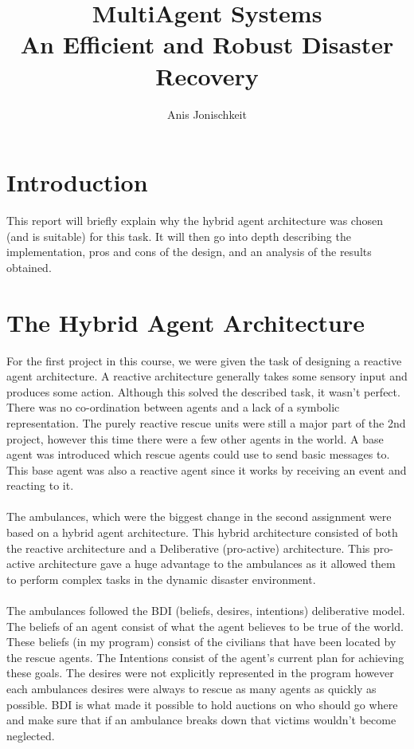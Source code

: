 \documentclass[titlepage]{article}
\begin{document}
\title{MultiAgent Systems \\ An Efficient and Robust Disaster Recovery}
\author{Anis Jonischkeit}

\maketitle

\section{Introduction}
  This report will briefly explain why the hybrid agent architecture was chosen (and is suitable) for this task. It will then go into depth describing the implementation, pros and cons of the design, and an analysis of the results obtained.

\section{The Hybrid Agent Architecture}
  For the first project in this course, we were given the task of designing a reactive agent architecture. A reactive architecture generally takes some sensory input and produces some action. Although this solved the described task, it wasn't perfect. There was no co-ordination between agents and a lack of a symbolic representation. The purely reactive rescue units were still a major part of the 2nd project, however this time there were a few other agents in the world. A base agent was introduced which rescue agents could use to send basic messages to. This base agent was also a reactive agent since it works by receiving an event and reacting to it. 
  \\ \\
  The ambulances, which were the biggest change in the second assignment were based on a hybrid agent architecture. This hybrid architecture consisted of both the reactive architecture and a Deliberative (pro-active) architecture. This pro-active architecture gave a huge advantage to the ambulances as it allowed them to perform complex tasks in the dynamic disaster environment. 
  \\ \\
  The ambulances followed the BDI (beliefs, desires, intentions) deliberative model. The beliefs of an agent consist of what the agent believes to be true of the world. These beliefs (in my program) consist of the civilians that have been located by the rescue agents. The Intentions consist of the agent's current plan for achieving these goals. The desires were not explicitly represented in the program however each ambulances desires were always to rescue as many agents as quickly as possible. BDI is what made it possible to hold auctions on who should go where and make sure that if an ambulance breaks down that victims wouldn't become neglected.
\end{document}
